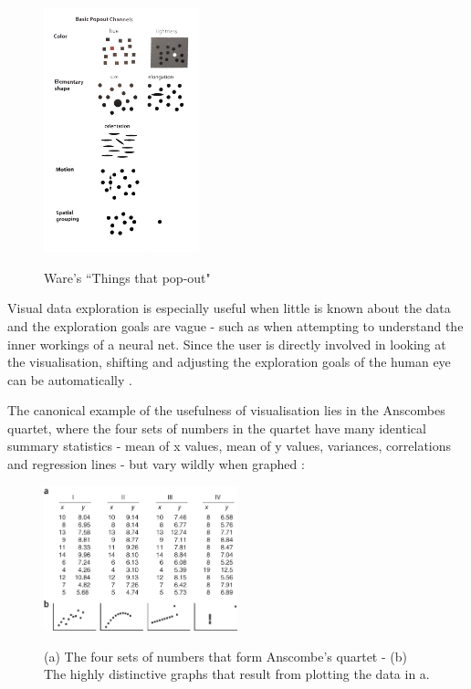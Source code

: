 \documentclass[a4paper,11pt,titlepage]{article}
\begin{document}
  		\begin{figure}[H]
    			\centering	
			{{\includegraphics[width=0.4\textwidth]
    				{img/ware_popout_channels.png} 
    			}}%
    			\caption{Ware's ``Things that pop-out"}%
    		\label{fig:Ware Pop-Out}
		\end{figure}
		
		\par 
		Visual data exploration is especially useful when little is known about the data and the exploration goals are vague - such as when attempting to understand the inner workings of a neural net. Since the user is directly involved in looking at the visualisation, shifting and adjusting the exploration goals of the human eye can be automatically \cite{Keim2002}.
		\par 
		The canonical example of the usefulness of visualisation lies in the Anscombes quartet, where the four sets of numbers in the quartet have many identical summary statistics - mean of x values, mean of y values, variances, correlations and regression lines - but vary wildly when graphed \cite{Shoresh2011}:

		\begin{figure}[H]
    			\centering	
				{{\includegraphics[width=0.5\textwidth]
    				{img/anscombes_quartet} 
    			}}%
    			\caption{(a) The four sets of numbers that form Anscombe's quartet -  (b) The highly distinctive graphs that result from plotting the data in a.}%
		\end{figure}
\end{document}

